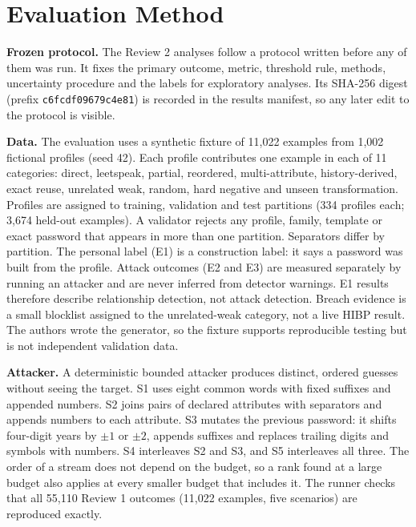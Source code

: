 \documentclass[preprint,12pt]{elsarticle}
\begin{document}
\section{Evaluation Method}
\label{sec:method}
\textbf{Frozen protocol.} The Review 2 analyses follow a protocol written before any of them was run. It fixes the primary outcome, metric, threshold rule, methods, uncertainty procedure and the labels for exploratory analyses. Its SHA-256 digest (prefix \texttt{c6fcdf09679c4e81}) is recorded in the results manifest, so any later edit to the protocol is visible.

\textbf{Data.} The evaluation uses a synthetic fixture of 11,022 examples from 1,002 fictional profiles (seed 42). Each profile contributes one example in each of 11 categories: direct, leetspeak, partial, reordered, multi-attribute, history-derived, exact reuse, unrelated weak, random, hard negative and unseen transformation. Profiles are assigned to training, validation and test partitions (334 profiles each; 3,674 held-out examples). A validator rejects any profile, family, template or exact password that appears in more than one partition. Separators differ by partition. The personal label (E1) is a construction label: it says a password was built from the profile. Attack outcomes (E2 and E3) are measured separately by running an attacker and are never inferred from detector warnings. E1 results therefore describe relationship detection, not attack detection. Breach evidence is a small blocklist assigned to the unrelated-weak category, not a live HIBP result. The authors wrote the generator, so the fixture supports reproducible testing but is not independent validation data.

\textbf{Attacker.} A deterministic bounded attacker produces distinct, ordered guesses without seeing the target. S1 uses eight common words with fixed suffixes and appended numbers. S2 joins pairs of declared attributes with separators and appends numbers to each attribute. S3 mutates the previous password: it shifts four-digit years by $\pm 1$ or $\pm 2$, appends suffixes and replaces trailing digits and symbols with numbers. S4 interleaves S2 and S3, and S5 interleaves all three. The order of a stream does not depend on the budget, so a rank found at a large budget also applies at every smaller budget that includes it. The runner checks that all 55,110 Review 1 outcomes (11,022 examples, five scenarios) are reproduced exactly.
\end{document}
